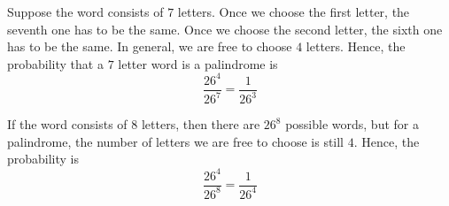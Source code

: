 Suppose the word consists of $7$ letters. Once we choose the first letter, 
the seventh one has to be the same. Once we choose the second letter, the 
sixth one has to be the same. In general, we are free to choose $4$ letters. 
Hence, the probability that a $7$ letter word is a palindrome is 
$$\frac{26^{4}}{26^{7}} = \frac{1}{26^{3}}$$

If the word consists of $8$ letters, then there are $26^{8}$ possible words, 
but for a palindrome, the number of letters we are free to choose is still $4$. 
Hence, the probability is $$\frac{26^{4}}{26^{8}} = \frac{1}{26^{4}}$$
